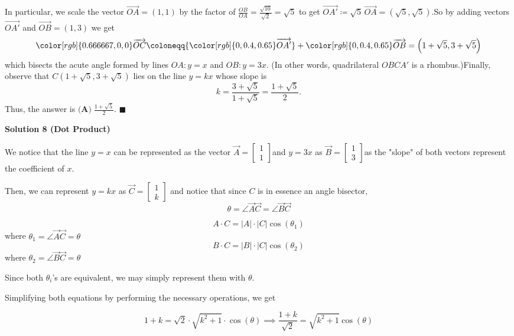 \begin{enumerate}
 In particular, we scale the vector $\overrightarrow{OA} = (1,1)$ by the factor of $\frac{OB}{OA} = \frac{\sqrt{10}}{\sqrt{2}} = \sqrt{5}$ to get $\overrightarrow{OA'} \coloneqq \sqrt{5}\,\overrightarrow{OA} = \left(\sqrt{5}, \sqrt{5}\right)$.So by adding vectors $\overrightarrow{OA'}$ and $\overrightarrow{OB} = (1,3)$ we get
 \[{\color[rgb]{0.666667,0,0}\overrightarrow{OC}}      \coloneqq {\color[rgb]{0,0.4,0.65}\overrightarrow{OA'}} + {\color[rgb]{0,0.4,0.65}\overrightarrow{OB}}      = \left( 1 + \sqrt{5}, 3 + \sqrt{5} \right)\]which bisects the acute angle formed by lines $OA: y = x$ and $OB: y = 3x$. (In other words, quadrilateral $OBCA'$ is a rhombus.)Finally, observe that $C\!\left(1+\sqrt{5}, 3+\sqrt{5}\right)$ lies on the line $y = kx$ whose slope is
 \[k = \frac{3+\sqrt{5}}{1+\sqrt{5}} = \frac{1+\sqrt{5}}{2}.\]Thus, the answer is $\boxed{\textbf{(A)}\;\frac{1+\sqrt{5}}{2}}$. $\blacksquare$




\textbf{Solution 8 (Dot Product)}

We notice that the line $y = x$ can be represented as the vector $\vec{A} = \begin{bmatrix}      1 \\ 1     \end{bmatrix}$and $y = 3x$ as $\vec{B} = \begin{bmatrix}      1 \\ 3     \end{bmatrix}$as the "slope" of both vectors represent the coefficient of $x$.

 Then, we can represent $y = kx$ as $\vec{C} = \begin{bmatrix}      1 \\ k     \end{bmatrix}$ and notice that since $C$ is in essence an angle bisector, 
 \[\theta = \angle \vec{A}\vec{C} = \angle \vec{B}\vec{C}\]

 \[A \cdot C = |A|\cdot|C|\cos(\theta_1)\] where $\theta_1 = \angle \vec{A}\vec{C} = \theta$
 \[B \cdot C = |B|\cdot|C|\cos(\theta_2)\] where $\theta_2 = \angle \vec{B}\vec{C} = \theta$

 Since both $\theta_i$'s are equivalent, we may simply represent them with $\theta$.

 Simplifying both equations by performing the necessary operations, we get

 
 \[1+k = \sqrt{2} \cdot \sqrt{k^2 + 1} \cdot \cos(\theta) \implies \frac{1+k}{\sqrt{2}} = \sqrt{k^2 + 1} \cos(\theta)\]


\end{enumerate}

